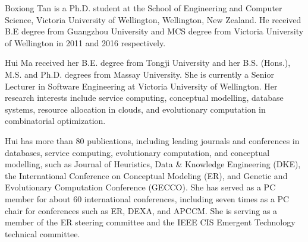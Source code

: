 \documentclass[10pt,journal,compsoc]{IEEEtran}
\begin{document}



\small
\begin{IEEEbiography}{Boxiong Tan}
is a Ph.D. student at the School of Engineering and Computer Science, Victoria University of
Wellington, Wellington, New Zealand. He received B.E degree from Guangzhou University and MCS degree from Victoria University of
Wellington in 2011 and 2016 respectively.
\end{IEEEbiography}
\vspace{-9.5 mm}
\begin{IEEEbiography}{Hui Ma}
received her B.E. degree from Tongji University and her B.S. (Hons.), M.S. and Ph.D. degrees from Massay University. She is currently a Senior Lecturer in Software Engineering at Victoria University of Wellington. Her research interests include service computing, conceptual modelling, database systems, resource allocation in clouds, and evolutionary computation in combinatorial optimization.

Hui has more than 80 publications, including leading journals and conferences in databases, service computing, evolutionary computation, and conceptual modelling, such as Journal of Heuristics, Data \& Knowledge Engineering (DKE), the International Conference on Conceptual Modeling (ER), and Genetic and Evolutionary Computation Conference (GECCO). She has served as a PC member for about 60 international conferences, including seven times as a PC chair for conferences such as ER, DEXA, and APCCM. She is serving as a member of the ER steering committee and the IEEE CIS Emergent Technology technical committee.
\end{IEEEbiography}
\end{document}
